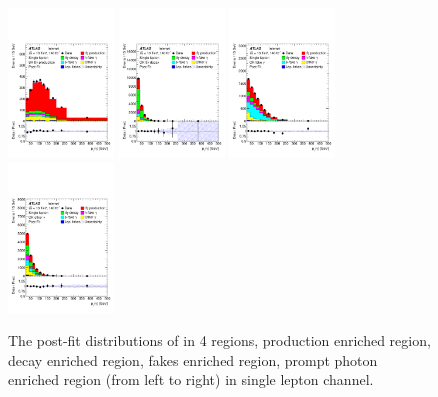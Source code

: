 \begin{figure}[ht]
  \centering
  \includegraphics[width=0.25\textwidth]{figures/diff_xsec/ljet/post_fit/tty1l_pt_all_syst/Plots/SR1_postFit.pdf}%
  \includegraphics[width=0.25\textwidth]{figures/diff_xsec/ljet/post_fit/tty1l_pt_all_syst/Plots/SR2_postFit.pdf}%
  \includegraphics[width=0.25\textwidth]{figures/diff_xsec/ljet/post_fit/tty1l_pt_all_syst/Plots/SR3_postFit.pdf}%
  \includegraphics[width=0.25\textwidth]{figures/diff_xsec/ljet/post_fit/tty1l_pt_all_syst/Plots/SR4_postFit.pdf}%
  \caption{The post-fit distributions of \ptgamma in 4 regions, \tty production enriched region, \tty decay enriched region, fakes enriched region, prompt photon enriched region (from left to right) in single lepton channel. }
  \label{fig:pt_postfit_ljet_realdata}
\end{figure}
\FloatBarrier



